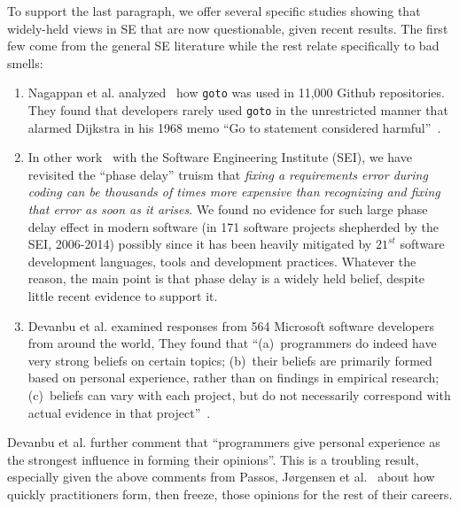 \documentclass{sig-alternate}
\begin{document}
To support the last paragraph, we offer several
specific studies
showing that   widely-held views in SE that are   now questionable, given recent results. 
The first few come from the general SE literature while the rest
relate specifically to bad smells:

\begin{enumerate} 
\item
Nagappan et al. analyzed~\cite{mei15} 
how   {\tt goto}  was used  in 11,000 Github repositories. 
They found that developers
rarely used {\tt goto} in the unrestricted manner that alarmed Dijkstra in his  1968
memo ``Go to statement considered harmful''~\cite{Dijkstra68}.
\item
In other work~\cite{me16phase} with the Software Engineering Institute (SEI), we have revisited
the ``phase delay'' truism that {\em fixing a requirements error  during
coding can be thousands of times more expensive than recognizing and fixing that error
as soon as it arises}. 
We found no evidence for such large   phase delay effect in modern
software (in 171 software projects shepherded
by the SEI, 2006-2014) possibly since it has been  heavily mitigated by $21^{st}$ software development languages, tools and development practices. 
Whatever the reason, the main point  is that phase delay is a widely
held belief, despite little recent evidence to support it.
\item
Devanbu et al.  examined responses from 564 Microsoft software developers from around
the world, They found that  ``(a)~programmers do indeed have very
strong beliefs on certain topics; (b)~their beliefs are primarily formed
based on personal experience, rather than on findings in empirical
research; (c)~beliefs can vary with each project, but do not necessarily
correspond with actual evidence in that project''~\cite{prem16}.
\end{enumerate}
Devanbu et al. further  comment that ``programmers give personal experience
as the strongest influence in forming their opinions''. This is a troubling
result, especially given the above comments from Passos,  J{\o}rgensen et al.~\cite{passos11,jorgensen09} about how quickly practitioners form, then freeze, those opinions for the rest of their
careers.
\end{document}
